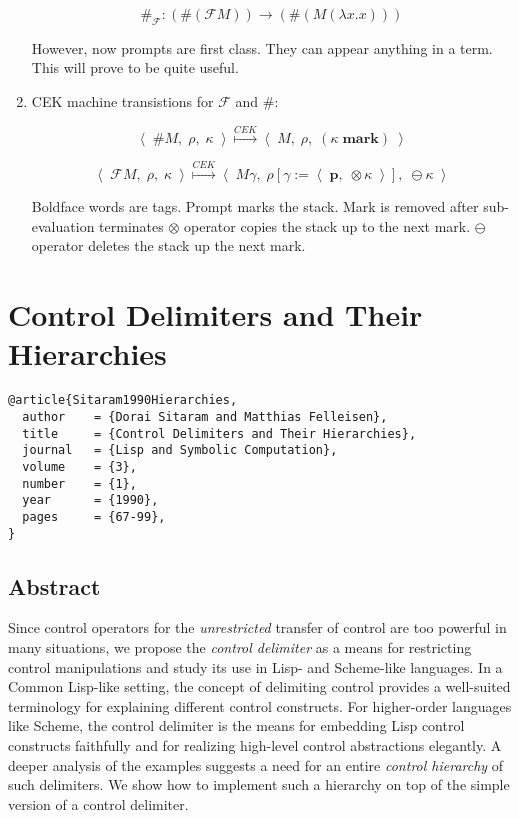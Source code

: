 \documentclass[letterpaper]{llncs}
\newcommand{\F}{ \ensuremath{ \mathcal{F} } }
\newcommand{\cek}[3]{ \ensuremath{ \left\langle \; #1, \; #2, \; #3 \; \right\rangle } }
\newcommand{\cekstep}{ \ensuremath{ \stackrel{CEK}{\longmapsto} } }
\newcommand{\clos}[2]{ \ensuremath{ \left\langle \; #1, \; #2 \; \right\rangle } }
\begin{document}
\begin{enumerate}
	$$\#_\F: (\# (\F M)) \rightarrow (\# (M (\lambda x.x)))$$
	
	However, now prompts are first class. They can appear anything in a term. This will prove to be quite useful.
	
	\item CEK machine transistions for $\F$ and \#:
	
	$$\cek{ \# M }{ \rho }{ \kappa } 
	      \cekstep 
	  \cek{ M }{ \rho }{ (\kappa \; \textbf{mark}) }$$
	
	$$\cek{ \F M }{ \rho }{ \kappa } 
	      \cekstep 
	  \cek{ M \gamma }{ \rho[\gamma := \clos{ \textbf{p} }{ \otimes \kappa }] }{ \ominus \kappa }$$
	
	Boldface words are tags. Prompt marks the stack. Mark is removed after sub-evaluation terminates $\otimes$ operator copies the stack up to the next mark. $\ominus$ operator deletes the stack up the next mark.
	
	

\end{enumerate}




\section*{Control Delimiters and Their Hierarchies}%

\begin{verbatim}
@article{Sitaram1990Hierarchies,
  author    = {Dorai Sitaram and Matthias Felleisen},
  title     = {Control Delimiters and Their Hierarchies},
  journal   = {Lisp and Symbolic Computation},
  volume    = {3},
  number    = {1},
  year      = {1990},
  pages     = {67-99},
}
\end{verbatim}

\subsection*{Abstract}
Since control operators for the \textit{unrestricted} transfer of control are too powerful in many situations, we propose the \textit{control delimiter} as a means for restricting control manipulations and study its use in Lisp- and Scheme-like languages. In a Common Lisp-like setting, the concept of delimiting control provides a well-suited terminology for explaining different control constructs. For higher-order languages like Scheme, the control delimiter is the means for embedding Lisp control constructs faithfully and for realizing high-level control abstractions elegantly. A deeper analysis of the examples suggests a need for an entire \textit{control hierarchy} of such delimiters. We show how to implement such a hierarchy on top of the simple version of a control delimiter.
\end{document}
